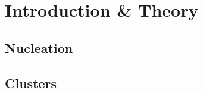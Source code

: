 
\part{Introduction \& Theory}
\label{sec:introductiontheory}

\chapter{Nucleation}
\label{sec:nucleation}

\chapter{Clusters}
\label{sec:clusters}
